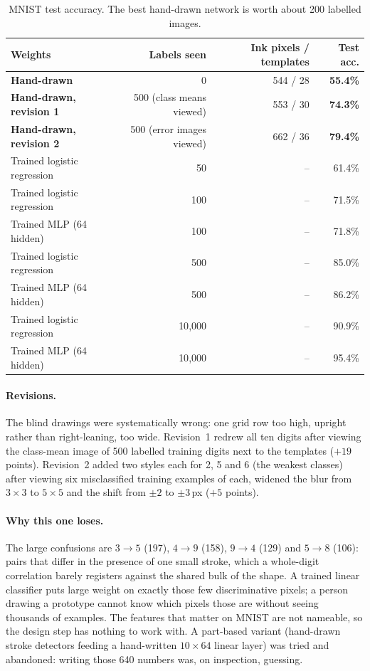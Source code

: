 \begin{table}[h]\centering
\begin{tabular}{lrrr}\toprule
Weights & Labels seen & Ink pixels / templates & Test acc.\\\midrule
\textbf{Hand-drawn} & 0 & 544 / 28 & \textbf{55.4\%}\\
\textbf{Hand-drawn, revision 1} & 500 (class means viewed) & 553 / 30 & \textbf{74.3\%}\\
\textbf{Hand-drawn, revision 2} & 500 (error images viewed) & 662 / 36 & \textbf{79.4\%}\\
Trained logistic regression & 50 & -- & 61.4\%\\
Trained logistic regression & 100 & -- & 71.5\%\\
Trained MLP (64 hidden) & 100 & -- & 71.8\%\\
Trained logistic regression & 500 & -- & 85.0\%\\
Trained MLP (64 hidden) & 500 & -- & 86.2\%\\
Trained logistic regression & 10{,}000 & -- & 90.9\%\\
Trained MLP (64 hidden) & 10{,}000 & -- & 95.4\%\\
\bottomrule\end{tabular}
\caption{MNIST test accuracy. The best hand-drawn network is worth about 200
labelled images.}
\label{tab:mnist}
\end{table}

\paragraph{Revisions.} The blind drawings were systematically wrong: one grid row
too high, upright rather than right-leaning, too wide. Revision~1 redrew all ten
digits after viewing the class-mean image of 500 labelled training digits next to
the templates ($+19$ points). Revision~2 added two styles each for 2, 5 and 6 (the
weakest classes) after viewing six misclassified training examples of each, widened
the blur from $3\times3$ to $5\times5$ and the shift from $\pm2$ to $\pm3$\,px
($+5$ points).

\paragraph{Why this one loses.} The large confusions are $3\to5$ (197), $4\to9$
(158), $9\to4$ (129) and $5\to8$ (106): pairs that differ in the presence of one
small stroke, which a whole-digit correlation barely registers against the shared
bulk of the shape. A trained linear classifier puts large weight on exactly those few
discriminative pixels; a person drawing a prototype cannot know which pixels those
are without seeing thousands of examples. The features that matter on MNIST are not
nameable, so the design step has nothing to work with. A part-based variant
(hand-drawn stroke detectors feeding a hand-written $10\times64$ linear layer) was
tried and abandoned: writing those 640 numbers was, on inspection, guessing.

